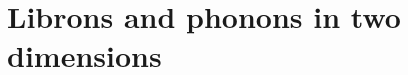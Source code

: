 \documentclass[12pt]{article}
\begin{document}
\newcommand{\pder}[2]{\frac{\partial {#1}}{\partial {#2}}}
\newcommand{\pdert}[2]{\frac{\partial^2 {#1}}{\partial {#2}^2}}
\newcommand{\fder}[2]{\frac{\delta {#1}}{\delta {#2}}}
\newcommand{\PDD}[3]{\left.\frac{\partial^{2}{#1}}{\partial{#2}^{2}}\right|_{#3}
}
\newcommand{\PD}[3]{\left.\frac{\partial{#1}}{\partial{#2}}\right|_{#3}}
\newcommand{\der}[2]{\frac{d {#1}}{d {#2}}}

\renewcommand{\deg}{^\circ}
\newcommand{\com}{{\bf [C] }}
\newcommand{\cend}{\Emark\[\]\vspace*{-1. cm}}
\newcommand{\x}{\times}

\newcommand{\win}{\ddot\smile}
\newcommand{\lose}{\ddot\frown}
\newcommand{\avg}[1]{\left \langle #1 \right \rangle}
\newcommand{\E}[1]{\ensuremath{\times10^{#1}}}
\newcommand{\abs}[1]{\ensuremath{\left | #1 \right |}}
\newcommand{\paren}[1]{\left(#1\right)}
\newcommand{\recip}[1]{\frac{1}{#1}}
\newcommand{\ex}[1]{\mathbb{E}[#1]}
\newcommand{\bprob}[1]{\textbf{#1~---}}
\newcommand{\unitv}[1]{\ensuremath{\mathbf{\hat{e}}_{#1}}}
\newcommand{\goto}{\rightarrow}
\newcommand{\expct}[1]{\mathbb{E}[#1]}
\newcommand{\mtrx}[1]{\begin{matrix}#1\end{matrix}}
\newcommand{\pmtrx}[1]{\paren{\begin{matrix}#1\end{matrix}}}
\newcommand{\cosp}[1]{\cos{\paren{#1}}}
\newcommand{\sinp}[1]{\sin{\paren{#1}}}
\newcommand{\tanp}[1]{\tan{\paren{#1}}}
\newcommand{\half}[1]{\frac{#1}{2}}
\newcommand{\ham}{\mathcal{H}}
\newcommand{\tr}{\mathrm{Tr}}
\newcommand{\bv}[1]{\mathbf{#1}}
\newcommand{\Der}[2]{\frac{d#1}{d#2}}
\renewcommand{\Dot}[2]{\ensuremath{\bv{#1}\cdot\bv{#2}}}
\newcommand{\Cross}[2]{\ensuremath{\bv{#1}\times\bv{#2}}}
\newcommand{\del}{\ensuremath{\partial}}
\newcommand{\R}{\ensuremath{\bv{r-r'}}}
\newcommand{\aR}{\ensuremath{\abs{\R}}}
\newcommand{\br}{\ensuremath{\bv{r}}}
\newcommand{\impl}{\ensuremath{\quad \Rightarrow \quad}}
\renewcommand{\div}[1]{\nabla \cdot \bv{#1}}
\newcommand{\curl}[1]{\nabla \times \bv{#1}}
\newcommand{\lapl}{\nabla^2}
\newcommand{\vint}{\int d^3r}
\newcommand{\oocs}{\recip{c^2}}
\newcommand{\mnfp}[1]{\frac{\mu_0 #1}{4\pi}}
\renewcommand{\iiint}{\int_{-\infty}^{\infty}}
\newcommand{\tpi}[1]{\paren{2\pi}^{#1}}
\newcommand{\ootpi}[1]{\recip{\paren{2\pi}^{#1}}}
\newcommand{\sqb}[1]{\left [ #1 \right ]}


\section{Librons and phonons in two dimensions}
\end{document}
